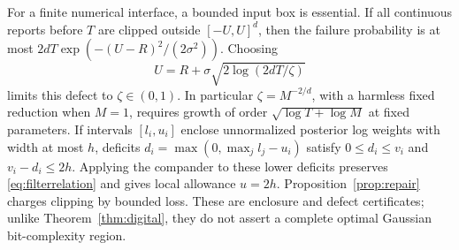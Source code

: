 For a finite numerical interface, a bounded input box is essential. If all continuous reports before $T$ are clipped outside $[-U,U]^d$, then the failure probability is at most $2dT\exp(-(U-R)^2/(2\sigma^2))$. Choosing
\begin{equation}\label{eq:clipping}
 U=R+\sigma\sqrt{2\log(2dT/\zeta)}
\end{equation}
limits this defect to $\zeta\in(0,1)$. In particular $\zeta=M^{-2/d}$, with a harmless fixed reduction when $M=1$, requires growth of order $\sqrt{\log T+\log M}$ at fixed parameters. If intervals $[l_i,u_i]$ enclose unnormalized posterior log weights with width at most $h$, deficits $d_i=\max(0,\max_jl_j-u_i)$ satisfy $0\le d_i\le v_i$ and $v_i-d_i\le2h$. Applying the compander to these lower deficits preserves \eqref{eq:filterrelation} and gives local allowance $u=2h$. Proposition~\ref{prop:repair} charges clipping by bounded loss. These are enclosure and defect certificates; unlike Theorem~\ref{thm:digital}, they do not assert a complete optimal Gaussian bit-complexity region.
